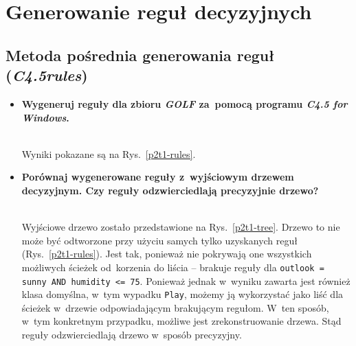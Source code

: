 
\section{Generowanie reguł decyzyjnych}

\subsection{Metoda pośrednia generowania reguł (\emph{C4.5rules})}
\begin{itemize}
\item \textbf{Wygeneruj reguły dla zbioru \emph{GOLF} za~pomocą programu \emph{C4.5 for Windows}.}


	\\Wyniki pokazane są na Rys.~\ref{p2t1-rules}.

\item \textbf{Porównaj wygenerowane reguły z~wyjściowym drzewem decyzyjnym. Czy reguły odzwierciedlają precyzyjnie drzewo?}



	\\Wyjściowe drzewo zostało przedstawione na Rys.~\ref{p2t1-tree}. Drzewo to nie może być odtworzone przy użyciu samych tylko uzyskanych reguł (Rys.~\ref{p2t1-rules}). Jest tak, ponieważ nie pokrywają one wszystkich możliwych ścieżek od~korzenia do liścia -- brakuje reguły dla \texttt{outlook = sunny AND humidity <= 75}. Ponieważ jednak w~wyniku zawarta jest również klasa domyślna, w~tym wypadku \texttt{Play}, możemy ją wykorzystać jako liść dla ścieżek w~drzewie odpowiadającym brakującym regułom. W~ten sposób, w~tym konkretnym przypadku, możliwe jest zrekonstruowanie drzewa. Stąd reguły odzwierciedlają drzewo w~sposób precyzyjny.
\end{itemize}

